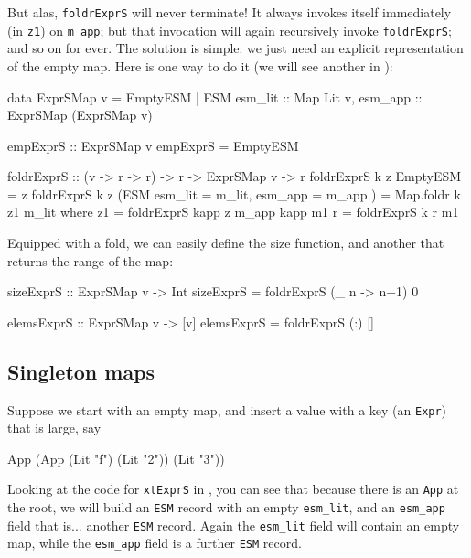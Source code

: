 \documentclass[acmsmall]{acmart}
\theoremstyle{theorem}
\theoremstyle{definition}
\theoremstyle{remark}
\begin{document}
But alas, \lstinline{foldrExprS} will never terminate!  It always invokes itself immediately
(in \lstinline{z1}) on \lstinline{m_app}; but that invocation will again recursively invoke
\lstinline{foldrExprS}; and so on for ever.
The solution is simple: we just need an explicit representation of the empty map.
Here is one way to do it (we will see another in ):
\begin{code}
data ExprSMap v = EmptyESM
                | ESM { esm_lit :: Map Lit v, esm_app :: ExprSMap (ExprSMap v) }

empExprS :: ExprSMap v
empExprS = EmptyESM

foldrExprS :: (v -> r -> r) -> r -> ExprSMap v -> r
foldrExprS k z EmptyESM                                   = z
foldrExprS k z (ESM { esm_lit = m_lit, esm_app = m_app }) = Map.foldr k z1 m_lit
  where
    z1 = foldrExprS kapp z m_app
    kapp m1 r = foldrExprS k r m1
\end{code}
Equipped with a fold, we can easily define the size function, and another
that returns the range of the map:
\begin{code}
  sizeExprS :: ExprSMap v -> Int
  sizeExprS = foldrExprS (\_ n -> n+1) 0

  elemsExprS :: ExprSMap v -> [v]
  elemsExprS = foldrExprS (:) []
\end{code}

\subsection{Singleton maps} \label{sec:singleton}

Suppose we start with an empty map, and insert a value
with a key (an \lstinline{Expr}) that is large, say
\begin{code}
  App (App (Lit "f") (Lit "2")) (Lit "3"))
\end{code}
Looking at the code
for \lstinline{xtExprS} in , you can see that
because there is an \lstinline{App} at the root, we will build an
\lstinline{ESM} record with an empty \lstinline{esm_lit}, and an
\lstinline{esm_app} field that is... another \lstinline{ESM}
record.  Again the \lstinline{esm_lit} field will contain an
empty map, while the \lstinline{esm_app} field is a further \lstinline{ESM} record.
\end{document}
